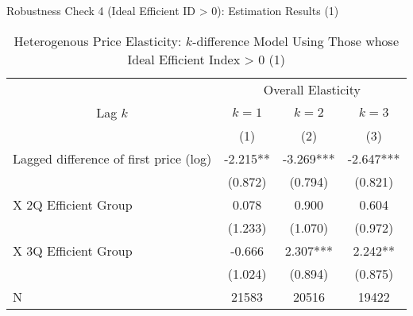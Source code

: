\documentclass[
  ignorenonframetext,
]{beamer}
\begin{document}
\begin{frame}{Robustness Check 4 (Ideal Efficient ID \textgreater{} 0): Estimation Results (1)}
\protect\hypertarget{robustness-check-4-ideal-efficient-id-0-estimation-results-1}{}
\begin{table}

\caption{\label{tab:kableSubsetHeterokDiffElasticitySlide1}Heterogenous Price Elasticity: $k$-difference Model Using Those whose Ideal Efficient Index > 0 (1)}
\centering
\fontsize{8}{10}\selectfont
\begin{tabular}[t]{lccc}
\toprule
\multicolumn{1}{c}{ } & \multicolumn{3}{c}{Overall Elasticity} \\
\cmidrule(l{3pt}r{3pt}){2-4}
\multicolumn{1}{c}{Lag $k$} & \multicolumn{1}{c}{$k = 1$} & \multicolumn{1}{c}{$k = 2$} & \multicolumn{1}{c}{$k = 3$} \\
\cmidrule(l{3pt}r{3pt}){1-1} \cmidrule(l{3pt}r{3pt}){2-2} \cmidrule(l{3pt}r{3pt}){3-3} \cmidrule(l{3pt}r{3pt}){4-4}
 & (1) & (2) & (3)\\
\midrule
Lagged difference of first price (log) & -2.215** & -3.269*** & -2.647***\\
 & (0.872) & (0.794) & (0.821)\\
\hspace{1em}X 2Q Efficient Group & 0.078 & 0.900 & 0.604\\
 & (1.233) & (1.070) & (0.972)\\
\hspace{1em}X 3Q Efficient Group & -0.666 & 2.307*** & 2.242**\\
 & (1.024) & (0.894) & (0.875)\\
N & 21583 & 20516 & 19422\\
\bottomrule
\end{tabular}
\end{table}
\end{frame}
\end{document}
